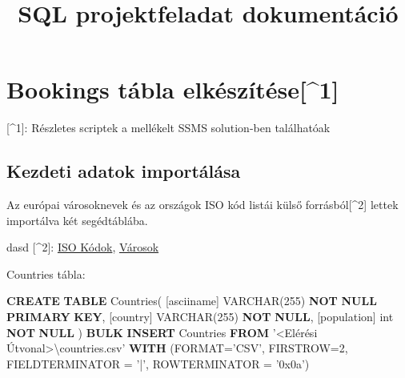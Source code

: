 \documentclass[
]{article}
\title{SQL projektfeladat dokumentáció}
\date{}
\newenvironment{Shaded}{\begin{snugshade}}{\end{snugshade}}
\newcommand{\DataTypeTok}[1]{\textcolor[rgb]{0.56,0.13,0.00}{#1}}
\newcommand{\DecValTok}[1]{\textcolor[rgb]{0.25,0.63,0.44}{#1}}
\newcommand{\KeywordTok}[1]{\textcolor[rgb]{0.00,0.44,0.13}{\textbf{#1}}}
\newcommand{\NormalTok}[1]{#1}
\newcommand{\OperatorTok}[1]{\textcolor[rgb]{0.40,0.40,0.40}{#1}}
\newcommand{\StringTok}[1]{\textcolor[rgb]{0.25,0.44,0.63}{#1}}
\begin{document}
\maketitle

\hypertarget{bookings-tuxe1bla-elkuxe9szuxedtuxe9se1}{%
\section{Bookings tábla
elkészítése{[}\^{}1{]}}\label{bookings-tuxe1bla-elkuxe9szuxedtuxe9se1}}

{[}\^{}1{]}: Részletes scriptek a mellékelt SSMS solution-ben
találhatóak

\hypertarget{kezdeti-adatok-importuxe1luxe1sa}{%
\subsection{Kezdeti adatok
importálása}\label{kezdeti-adatok-importuxe1luxe1sa}}

Az európai városoknevek és az országok ISO kód listái külső
forrásból{[}\^{}2{]} lettek importálva két segédtáblába.

dasd {[}\^{}2{]}:
\href{https://datahub.io/core/country-list?fbclid=IwAR1Kapllmzc9sthOPNstkF23BomEfkQeLyivSLC2joxgqqdsoksLm9FP3qw}{ISO
Kódok},
\href{http://worldpopulationreview.com/continents/cities-in-europe/?fbclid=IwAR2zDepceQtlVAJOgoXHoPPrG6RKVhriUGgWYut_feKryAoLXVCs36y-Ip0}{Városok}

Countries tábla:

\begin{Shaded}
\begin{Highlighting}[]
\KeywordTok{CREATE} \KeywordTok{TABLE}\NormalTok{ Countries(}
\NormalTok{    [asciiname] }\DataTypeTok{VARCHAR}\NormalTok{(}\DecValTok{255}\NormalTok{) }\KeywordTok{NOT} \KeywordTok{NULL} \KeywordTok{PRIMARY} \KeywordTok{KEY}\NormalTok{,}
\NormalTok{    [country] }\DataTypeTok{VARCHAR}\NormalTok{(}\DecValTok{255}\NormalTok{) }\KeywordTok{NOT} \KeywordTok{NULL}\NormalTok{,}
\NormalTok{    [population] }\DataTypeTok{int} \KeywordTok{NOT} \KeywordTok{NULL}
\NormalTok{)}
\KeywordTok{BULK} \KeywordTok{INSERT}\NormalTok{ Countries}
\KeywordTok{FROM} \StringTok{'<Elérési Útvonal>\textbackslash{}countries.csv'}
\KeywordTok{WITH}\NormalTok{ (FORMAT}\OperatorTok{=}\StringTok{'CSV'}\NormalTok{,}
\NormalTok{    FIRSTROW}\OperatorTok{=}\DecValTok{2}\NormalTok{,}
\NormalTok{    FIELDTERMINATOR }\OperatorTok{=} \StringTok{'|'}\NormalTok{,}
\NormalTok{    ROWTERMINATOR }\OperatorTok{=} \StringTok{'0x0a'}\NormalTok{)}

\end{Highlighting}
\end{Shaded}
\end{document}
